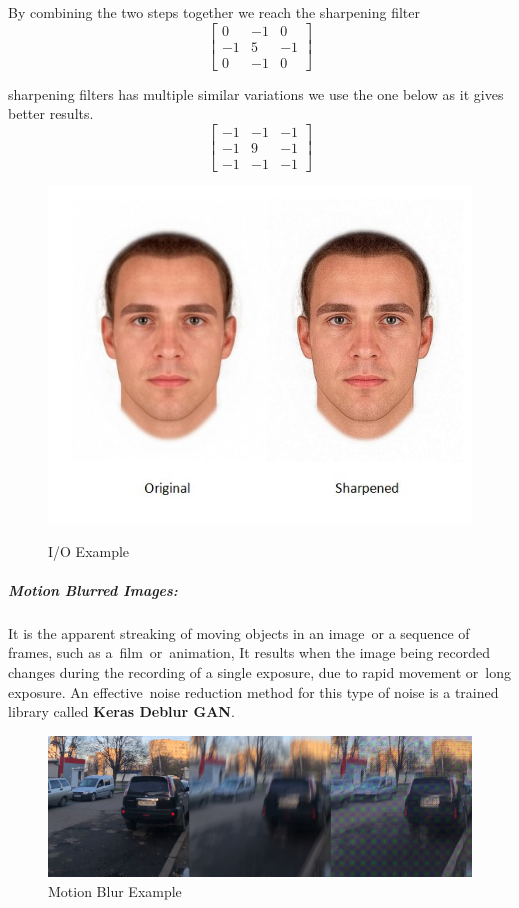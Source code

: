 By combining the two steps together we reach the sharpening filter
\[
\begin{bmatrix}
0 & -1 & 0 \\
-1 & 5 & -1 \\
0 & -1 & 0
\end{bmatrix} \]

sharpening filters has multiple similar variations we use the one below as it gives better results.
\[
\begin{bmatrix}
-1 & -1 & -1 \\
-1 & 9 & -1 \\
-1 & -1 & -1
\end{bmatrix} \]

\begin{figure}[H]
	\centering
	\includegraphics[width=0.5\linewidth]{images/Sharpened.jpg}
	\label{figure:laplacian}
	\caption{I/O Example}
\end{figure}

\subparagraph{Motion Blurred Images:}
It is the apparent streaking of moving objects in an image or a sequence of frames, such as a film or animation, It results when the image being recorded changes during the recording of a single exposure, due to rapid movement or long exposure.\newline
An effective noise reduction method for this type of noise is a trained library called \textbf{Keras Deblur GAN}.\newline
\begin{figure}[H]
	\centering
	\includegraphics[width=\linewidth]{images/motion_blur.png}
	\caption{Motion Blur Example}
\end{figure}

